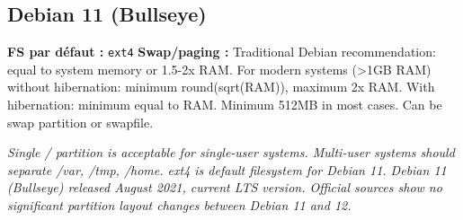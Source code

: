 \documentclass[10pt,a4paper]{article}
\begin{document}
\subsection{Debian 11 (Bullseye)}
\noindent\small \textbf{FS par d\'efaut :} \texttt{ext4} \quad\textbullet\quad \textbf{Swap/paging :} Traditional Debian recommendation: equal to system memory or 1.5-2x RAM. For modern systems (>1GB RAM) without hibernation: minimum round(sqrt(RAM)), maximum 2x RAM. With hibernation: minimum equal to RAM. Minimum 512MB in most cases. Can be swap partition or swapfile.\normalsize\par\smallskip
\noindent\small\textit{Single / partition is acceptable for single-user systems. Multi-user systems should separate /var, /tmp, /home. ext4 is default filesystem for Debian 11. Debian 11 (Bullseye) released August 2021, current LTS version. Official sources show no significant partition layout changes between Debian 11 and 12.}\normalsize\par\smallskip
\end{document}
